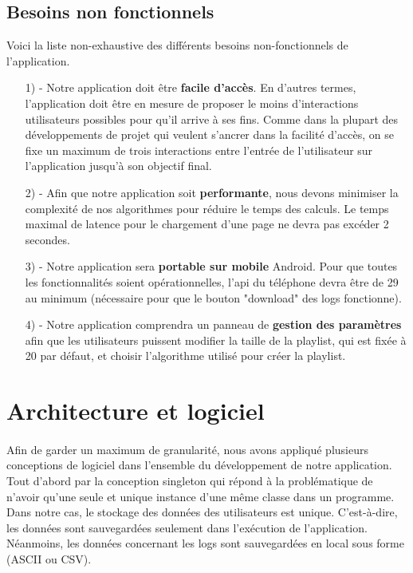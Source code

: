 \documentclass[12pt, openany]{report}
\begin{document}
\subsection{Besoins non fonctionnels}

Voici la liste non-exhaustive des différents besoins non-fonctionnels de l'application.

\begin{itemize}
\item[1) -] Notre application doit être \textbf{facile d'accès}. En d'autres termes, l'application doit être en mesure de proposer le moins d'interactions utilisateurs possibles pour qu'il arrive à ses fins. Comme dans la plupart des développements de projet qui veulent s'ancrer dans la facilité d'accès, on se fixe un maximum de trois interactions entre l'entrée de l'utilisateur sur l'application jusqu'à son objectif final.
\\
\item[2) -] Afin que notre application soit \textbf{performante}, nous devons minimiser la complexité de nos algorithmes pour réduire le temps des calculs. Le temps maximal de latence pour le chargement d'une page ne devra pas excéder 2 secondes. 
\\
\item[3) -] Notre application sera \textbf{portable sur mobile} Android. Pour que toutes les fonctionnalités soient opérationnelles, l'api du téléphone devra être de 29 au minimum (nécessaire pour que le bouton "download" des logs fonctionne).
\\
\item[4) -] Notre application comprendra un panneau de \textbf{gestion des paramètres} afin que les utilisateurs puissent modifier la taille de la playlist, qui est fixée à 20 par défaut, et choisir l'algorithme utilisé pour créer la playlist.
\end{itemize}


\newpage
\section{Architecture et logiciel}

\paragraph{}Afin de garder un maximum de granularité, nous avons appliqué plusieurs conceptions de logiciel dans l'ensemble du développement de notre application. Tout d'abord par la conception singleton qui répond à la problématique de n'avoir qu'une seule et unique instance d'une même classe dans un programme. Dans notre cas, le stockage des données des utilisateurs est unique. C'est-à-dire, les données sont sauvegardées seulement dans l'exécution de l'application. Néanmoins, les données concernant les logs sont sauvegardées en local sous forme (ASCII ou CSV).
\end{document}
